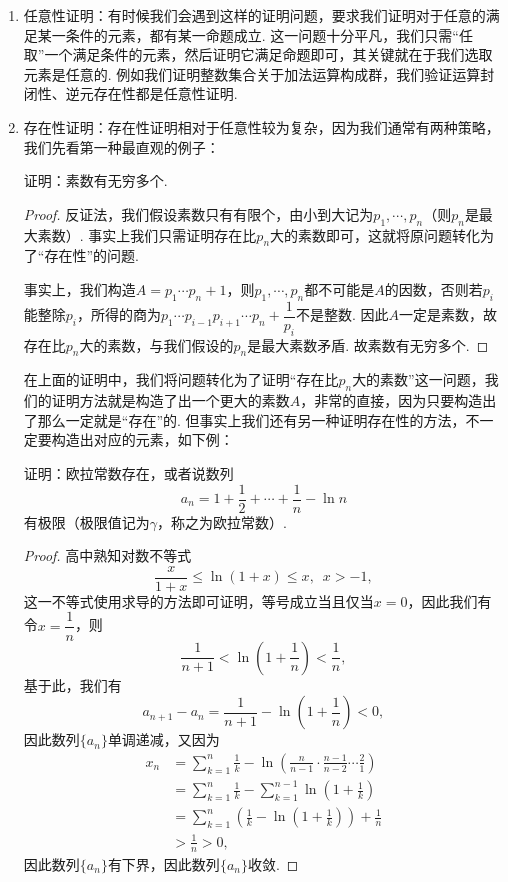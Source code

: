 \begin{enumerate}
    \item 任意性证明：有时候我们会遇到这样的证明问题，要求我们证明对于任意的满足某一条件的元素，都有某一命题成立. 这一问题十分平凡，我们只需``任取''一个满足条件的元素，然后证明它满足命题即可，其关键就在于我们选取元素是任意的. 例如我们证明整数集合关于加法运算构成群，我们验证运算封闭性、逆元存在性都是任意性证明.

    \item 存在性证明：存在性证明相对于任意性较为复杂，因为我们通常有两种策略，我们先看第一种最直观的例子：
    \begin{example*}
        证明：素数有无穷多个.
    \end{example*}
    \begin{proof}
        反证法，我们假设素数只有有限个，由小到大记为$p_1,\cdots,p_n$（则$p_n$是最大素数）. 事实上我们只需证明存在比$p_n$大的素数即可，这就将原问题转化为了``存在性''的问题.

        事实上，我们构造$A=p_1\cdots p_n+1$，则$p_1,\cdots,p_n$都不可能是$A$的因数，否则若$p_i$能整除$p_i$，所得的商为$p_1\cdots p_{i-1}p_{i+1}\cdots p_n+\dfrac{1}{p_i}$不是整数. 因此$A$一定是素数，故存在比$p_n$大的素数，与我们假设的$p_n$是最大素数矛盾. 故素数有无穷多个.
    \end{proof}

    在上面的证明中，我们将问题转化为了证明``存在比$p_n$大的素数''这一问题，我们的证明方法就是构造了出一个更大的素数$A$，非常的直接，因为只要构造出了那么一定就是``存在''的. 但事实上我们还有另一种证明存在性的方法，不一定要构造出对应的元素，如下例：
    \begin{example*}
        证明：欧拉常数存在，或者说数列
        \[a_n=1+\dfrac{1}{2}+\cdots+\dfrac{1}{n}-\ln n\]
        有极限（极限值记为$\gamma$，称之为欧拉常数）.
    \end{example*}
    \begin{proof}
        高中熟知对数不等式
        \[\frac{x}{1+x}\leqslant\ln(1+x)\leqslant x,\enspace x>-1,\]
        这一不等式使用求导的方法即可证明，等号成立当且仅当$x=0$，因此我们有
        令$x=\dfrac{1}{n}$，则
        \[\frac{1}{n+1}<\ln\left(1+\frac{1}{n}\right)<\frac{1}{n},\]
        基于此，我们有
        \[a_{n+1}-a_n=\frac{1}{n+1}-\ln\left(1+\frac{1}{n}\right)<0,\]
        因此数列$\{a_n\}$单调递减，又因为
        \begin{align*}
            x_n&=\sum\limits_{k=1}^n\frac{1}{k}-\ln(\frac{n}{n-1}\cdot \frac{n-1}{n-2}\cdots\frac{2}{1})\\
            &=\sum\limits_{k=1}^n\frac{1}{k}-\sum\limits_{k=1}^{n-1}\ln(1+\frac{1}{k})\\
            &=\sum\limits_{k=1}^n\left(\frac{1}{k}-\ln(1+\frac{1}{k})\right)+\frac{1}{n} \\
            &>\frac{1}{n}>0,
        \end{align*}
        因此数列$\{a_n\}$有下界，因此数列$\{a_n\}$收敛.
    \end{proof}


\end{enumerate}
